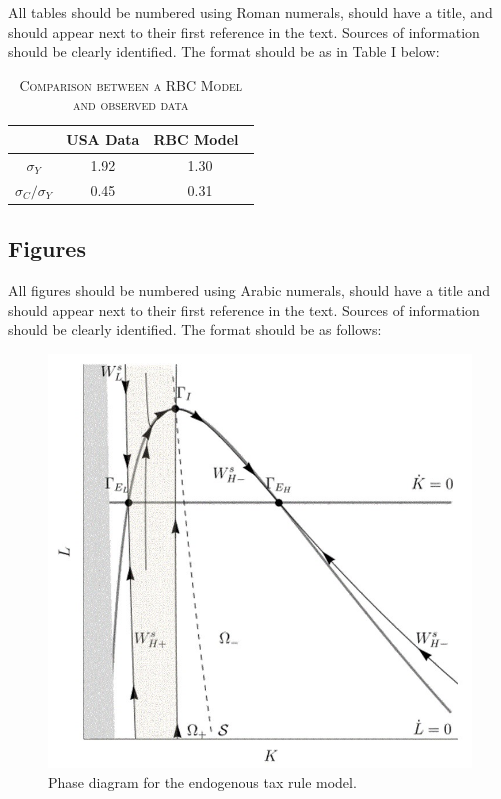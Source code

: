 \documentclass [12pt,a4paper,oneside]{article}
\begin{document}
All tables should be numbered using Roman numerals, should have a title, and should appear next to their first reference in the text. Sources of information should be clearly identified. The format should be as in Table I below:

\begin{table}[h]%
\centering
{\def\arraystretch{1.6}
\setlength{\tabcolsep}{14pt}
\caption{\textsc{Comparison between a RBC Model and observed data}}

\begin{tabular}{@{}ccc}

\hline\hline
& USA Data & RBC Model\ \\ \hline

$\sigma_{Y}$ & 1.92 & 1.30 %
 \\ 
$\sigma_{C}/\sigma_{Y}$ & 0.45 & 0.31 %
 \\ \toprule

\end{tabular}%
 }
\label{table:1}
\end{table}%

	\subsection{Figures}

All figures should be numbered using Arabic numerals, should have a title and should appear next to their first reference in the text. Sources of information should be clearly identified. The format should be as follows:

\begin{figure}[h]%
\centering

\includegraphics[scale=0.35]{phase_diagram}

\caption{Phase diagram for the endogenous tax rule model.}
\label{fig:phase_diagram.}

\end{figure}
\end{document}

